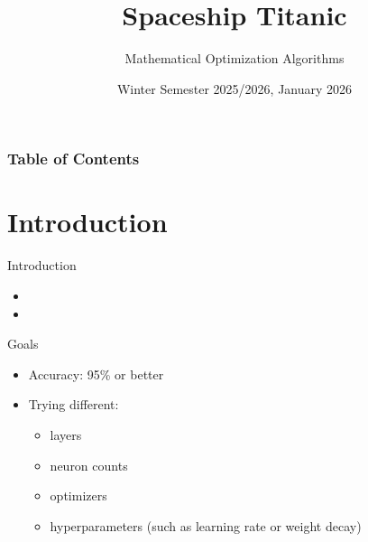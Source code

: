 \documentclass{beamer}
\title[Mathematical Optimization Algorithms] %
{Spaceship Titanic}
\subtitle{Mathematical Optimization Algorithms}
\author[] %
{}
\institute[] %
{
}
\date[WS 2025/2026] %
{Winter Semester 2025/2026, January 2026}
\begin{document}
\frame{\titlepage}


\begin{frame}
\frametitle{Table of Contents}
\tableofcontents
\end{frame}

\section{Introduction}
\begin{frame}{Introduction}
    \begin{itemize}
        \item 
        \item
    \end{itemize}
\end{frame}

\begin{frame}{Goals}
    \begin{itemize}
        \item Accuracy: 95\% or better
        \item Trying different: 
            \begin{itemize}
                \item layers
                \item neuron counts
                \item optimizers
                \item hyperparameters (such as learning rate or weight decay)
            \end{itemize}
    \end{itemize}
\end{frame}

\end{document}
